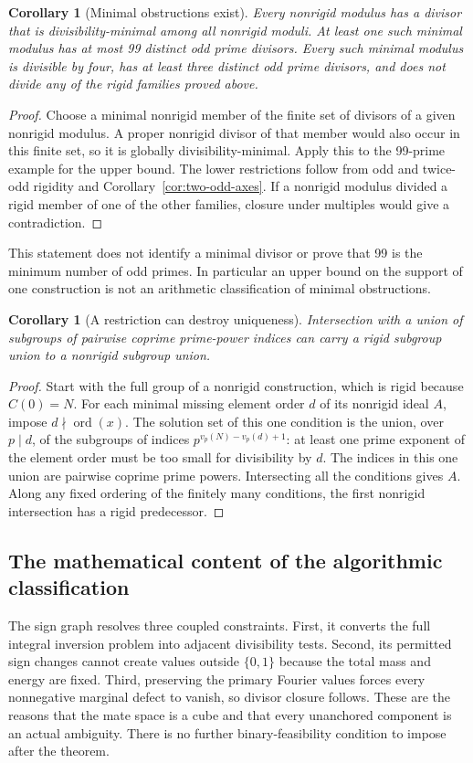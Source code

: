 \documentclass[11pt]{article}
\numberwithin{equation}{section}
\newtheorem{corollary}[theorem]{Corollary}
\theoremstyle{definition}
\theoremstyle{remark}
\newcommand{\ord}{\operatorname{ord}}
\begin{document}
\begin{corollary}[Minimal obstructions exist]\label{v2:cor:minimal}
Every nonrigid modulus has a divisor that is divisibility-minimal among all nonrigid moduli. At least one such minimal modulus has at most 99 distinct odd prime divisors. Every such minimal modulus is divisible by four, has at least three distinct odd prime divisors, and does not divide any of the rigid families proved above.
\end{corollary}
\begin{proof}
Choose a minimal nonrigid member of the finite set of divisors of a given nonrigid modulus. A proper nonrigid divisor of that member would also occur in this finite set, so it is globally divisibility-minimal. Apply this to the 99-prime example for the upper bound. The lower restrictions follow from odd and twice-odd rigidity and Corollary~\ref{cor:two-odd-axes}. If a nonrigid modulus divided a rigid member of one of the other families, closure under multiples would give a contradiction.
\end{proof}
This statement does not identify a minimal divisor or prove that 99 is the minimum number of odd primes. In particular an upper bound on the support of one construction is not an arithmetic classification of minimal obstructions.

\begin{corollary}[A restriction can destroy uniqueness]
Intersection with a union of subgroups of pairwise coprime prime-power indices can carry a rigid subgroup union to a nonrigid subgroup union.
\end{corollary}
\begin{proof}
Start with the full group of a nonrigid construction, which is rigid because $C(0)=N$. For each minimal missing element order $d$ of its nonrigid ideal $A$, impose $d\nmid\ord(x)$. The solution set of this one condition is the union, over $p\mid d$, of the subgroups of indices $p^{v_p(N)-v_p(d)+1}$: at least one prime exponent of the element order must be too small for divisibility by $d$. The indices in this one union are pairwise coprime prime powers. Intersecting all the conditions gives $A$. Along any fixed ordering of the finitely many conditions, the first nonrigid intersection has a rigid predecessor.
\end{proof}

\subsection{The mathematical content of the algorithmic classification}
The sign graph resolves three coupled constraints. First, it converts the full integral inversion problem into adjacent divisibility tests. Second, its permitted sign changes cannot create values outside $\{0,1\}$ because the total mass and energy are fixed. Third, preserving the primary Fourier values forces every nonnegative marginal defect to vanish, so divisor closure follows. These are the reasons that the mate space is a cube and that every unanchored component is an actual ambiguity. There is no further binary-feasibility condition to impose after the theorem.
\end{document}
